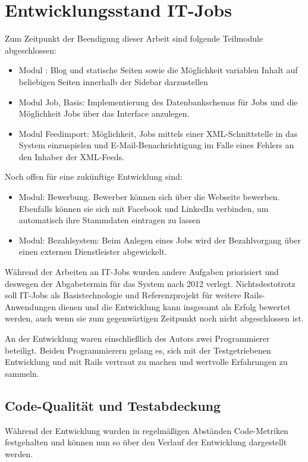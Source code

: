 \section{Entwicklungsstand IT-Jobs}
Zum Zeitpunkt der Beendigung dieser Arbeit sind folgende Teilmodule abgeschlossen:
\begin{itemize}
 \item Modul : Blog und statische Seiten sowie die Möglichkeit variablen Inhalt auf beliebigen Seiten innerhalb der Sidebar darzustellen
 \item Modul Job, Basis: Implementierung des Datenbankschemas für Jobs und die Möglichkeit Jobs über das Interface anzulegen.
 \item Modul Feedimport: Möglichkeit, Jobs mittels einer XML-Schnittstelle in das System einzuspielen und E-Mail-Benachrichtigung im Falle eines Fehlers an den Inhaber der XML-Feeds.
\end{itemize}
Noch offen für eine zukünftige Entwicklung sind:
\begin{itemize}
 \item Modul: Bewerbung. Bewerber können sich über die Webseite bewerben. Ebenfalls können sie sich mit Facebook und LinkedIn verbinden, um automatisch ihre Stammdaten eintragen zu lassen
 \item Modul: Bezahlsystem: Beim Anlegen eines Jobs wird der Bezahlvorgang über einen externen Dienstleister abgewickelt.
\end{itemize}

Während der Arbeiten an IT-Jobs wurden andere Aufgaben priorisiert und deswegen der Abgabetermin für das System nach 2012 verlegt. Nichtsdestotrotz soll IT-Jobs als Basistechnologie und Referenzprojekt für weitere Rails-Anwendungen dienen und die Entwicklung kann insgesamt als Erfolg bewertet werden, auch wenn sie zum gegenwärtigen Zeitpunkt noch nicht abgeschlossen ist.

An der Entwicklung waren einschließlich des Autors zwei Programmierer beteiligt. Beiden Programmierern gelang es, sich mit der Testgetriebenen Entwicklung und mit Rails vertraut zu machen und wertvolle Erfahrungen zu sammeln.

\subsection*{Code-Qualität und Testabdeckung}
Während der Entwicklung wurden in regelmäßigen Abständen Code-Metriken festgehalten und können nun so über den Verlauf der Entwicklung dargestellt werden.

